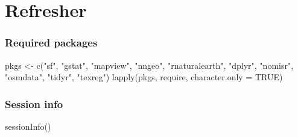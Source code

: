 \documentclass[
  letterpaper,
  DIV=11,
  numbers=noendperiod]{scrreprt}
\newenvironment{Shaded}{\begin{snugshade}}{\end{snugshade}}
\newcommand{\AttributeTok}[1]{\textcolor[rgb]{0.40,0.45,0.13}{#1}}
\newcommand{\ConstantTok}[1]{\textcolor[rgb]{0.56,0.35,0.01}{#1}}
\newcommand{\FunctionTok}[1]{\textcolor[rgb]{0.28,0.35,0.67}{#1}}
\newcommand{\NormalTok}[1]{\textcolor[rgb]{0.00,0.23,0.31}{#1}}
\newcommand{\OtherTok}[1]{\textcolor[rgb]{0.00,0.23,0.31}{#1}}
\newcommand{\StringTok}[1]{\textcolor[rgb]{0.13,0.47,0.30}{#1}}
\begin{document}

\hypertarget{refresher}{%
\chapter{Refresher}\label{refresher}}

\hypertarget{required-packages}{%
\subsection*{Required packages}\label{required-packages}}

\begin{Shaded}
\begin{Highlighting}[]
\NormalTok{pkgs }\OtherTok{\textless{}{-}} \FunctionTok{c}\NormalTok{(}\StringTok{"sf"}\NormalTok{, }\StringTok{"gstat"}\NormalTok{, }\StringTok{"mapview"}\NormalTok{, }\StringTok{"nngeo"}\NormalTok{, }\StringTok{"rnaturalearth"}\NormalTok{, }\StringTok{"dplyr"}\NormalTok{,}
          \StringTok{"nomisr"}\NormalTok{, }\StringTok{"osmdata"}\NormalTok{, }\StringTok{"tidyr"}\NormalTok{, }\StringTok{"texreg"}\NormalTok{) }
\FunctionTok{lapply}\NormalTok{(pkgs, require, }\AttributeTok{character.only =} \ConstantTok{TRUE}\NormalTok{)}
\end{Highlighting}
\end{Shaded}

\hypertarget{session-info}{%
\subsection*{Session info}\label{session-info}}

\begin{Shaded}
\begin{Highlighting}[]
\FunctionTok{sessionInfo}\NormalTok{()}
\end{Highlighting}
\end{Shaded}
\end{document}
